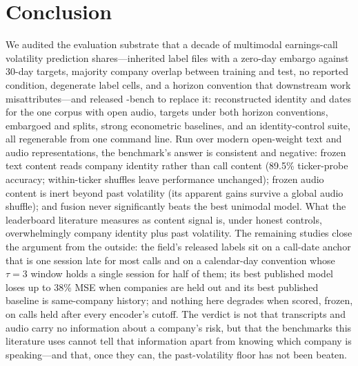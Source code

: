 \section{Conclusion}
\label{sec:conclusion}

We audited the evaluation substrate that a decade of multimodal earnings-call
volatility prediction shares---inherited label files with a zero-day embargo
against 30-day targets, majority company overlap between training and test, no
reported \tickerdisjoint{} condition, degenerate label cells, and a horizon
convention that downstream work misattributes---and released \ecvol-bench to
replace it: reconstructed identity and dates for the one corpus with open audio,
targets under both horizon conventions, embargoed and \tickerdisjoint{} splits,
strong econometric baselines, and an identity-control suite, all regenerable from
one command line. Run over modern open-weight text and audio representations, the
benchmark's answer is consistent and negative: frozen text content reads company
identity rather than call content (89.5\% ticker-probe accuracy; within-ticker
shuffles leave performance unchanged); frozen audio content is inert beyond past
volatility (its apparent gains survive a global audio shuffle); and fusion never
significantly beats the best unimodal model. What the leaderboard literature
measures as content signal is, under honest controls, overwhelmingly company
identity plus past volatility.
The remaining studies close the argument from the outside: the field's released
labels sit on a call-date anchor that is one session late for most calls and on a
calendar-day convention whose $\tau{=}3$ window holds a single session for half of
them; its best published model loses up to 38\% MSE when companies are held out
and its best published baseline is same-company history; and nothing here degrades
when scored, frozen, on calls held after every encoder's cutoff. The verdict is
not that transcripts and audio carry no information about a company's risk, but
that the benchmarks this literature uses cannot tell that information apart from
knowing which company is speaking---and that, once they can, the past-volatility
floor has not been beaten.
